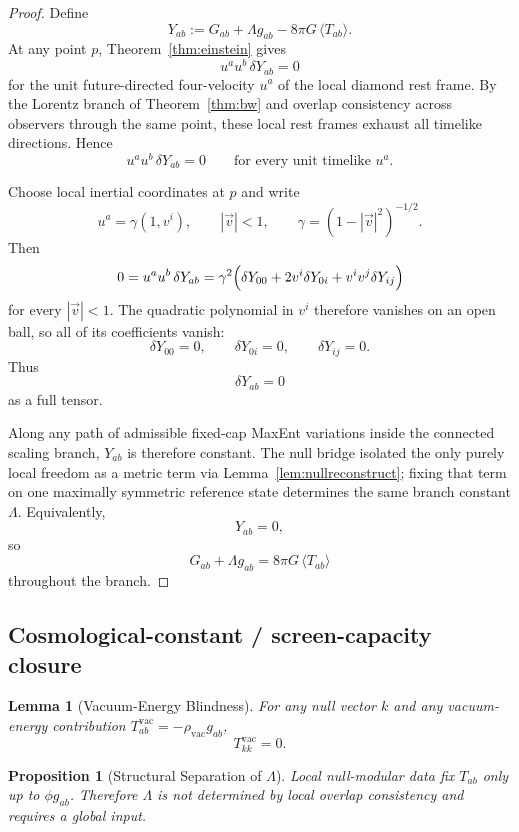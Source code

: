 \documentclass[11pt]{article}
\newtheorem{proposition}[theorem]{Proposition}
\newtheorem{lemma}[theorem]{Lemma}
\begin{document}
\begin{proof}
Define
\[
Y_{ab}:=G_{ab}+\Lambda g_{ab}-8\pi G\,\langle T_{ab}\rangle.
\]
At any point $p$, Theorem~\ref{thm:einstein} gives
\[
u^a u^b\,\delta Y_{ab}=0
\]
for the unit future-directed four-velocity $u^a$ of the local diamond rest frame. By the Lorentz branch of Theorem~\ref{thm:bw} and overlap consistency across observers through the same point, these local rest frames exhaust all timelike directions. Hence
\[
u^a u^b\,\delta Y_{ab}=0
\qquad
\text{for every unit timelike }u^a.
\]

Choose local inertial coordinates at $p$ and write
\[
u^a=\gamma(1,v^i),
\qquad
|\vec v|<1,
\qquad
\gamma=(1-|\vec v|^2)^{-1/2}.
\]
Then
\[
0=u^a u^b\,\delta Y_{ab}
=
\gamma^2\Bigl(\delta Y_{00}+2v^i\delta Y_{0i}+v^iv^j\delta Y_{ij}\Bigr)
\]
for every $|\vec v|<1$. The quadratic polynomial in $v^i$ therefore vanishes on an open ball, so all of its coefficients vanish:
\[
\delta Y_{00}=0,\qquad
\delta Y_{0i}=0,\qquad
\delta Y_{ij}=0.
\]
Thus
\[
\delta Y_{ab}=0
\]
as a full tensor.

Along any path of admissible fixed-cap MaxEnt variations inside the connected scaling branch, $Y_{ab}$ is therefore constant. The null bridge isolated the only purely local freedom as a metric term via Lemma~\ref{lem:nullreconstruct}; fixing that term on one maximally symmetric reference state determines the same branch constant $\Lambda$. Equivalently,
\[
Y_{ab}=0,
\]
so
\[
G_{ab}+\Lambda g_{ab}=8\pi G\,\langle T_{ab}\rangle
\]
throughout the branch.
\end{proof}

\subsection{Cosmological-constant / screen-capacity closure}

\begin{lemma}[Vacuum-Energy Blindness]\label{lem:vac}
For any null vector $k$ and any vacuum-energy contribution $T^{\mathrm{vac}}_{ab}=-\rho_{\mathrm{vac}}g_{ab}$,
\[
T^{\mathrm{vac}}_{kk}=0.
\]
\end{lemma}

\begin{proposition}[Structural Separation of $\Lambda$]\label{prop:lambda}
Local null-modular data fix $T_{ab}$ only up to $\phi g_{ab}$. Therefore $\Lambda$ is not determined by local overlap consistency and requires a global input.
\end{proposition}
\end{document}
